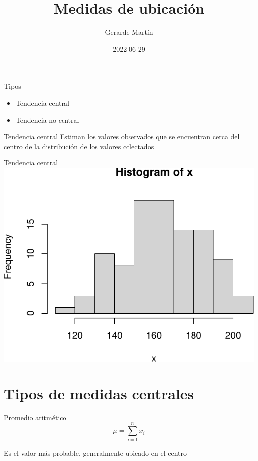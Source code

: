 \documentclass[
  11pt,
  ignorenonframetext,
]{beamer}
\title{Medidas de ubicación}
\author{Gerardo Martín}
\date{2022-06-29}
\begin{document}
\frame{\titlepage}

\begin{frame}{Tipos}
\protect\hypertarget{tipos}{}
\begin{itemize}
\item
  Tendencia central
\item
  Tendencia no central
\end{itemize}
\end{frame}

\begin{frame}{Tendencia central}
\protect\hypertarget{tendencia-central}{}
Estiman los valores observados que se encuentran cerca del centro de la
distribución de los valores colectados
\end{frame}

\begin{frame}{Tendencia central}
\protect\hypertarget{tendencia-central-1}{}
\includegraphics{Medidas-ubicacion_files/figure-beamer/unnamed-chunk-1-1.pdf}
\end{frame}

\hypertarget{tipos-de-medidas-centrales}{%
\section{Tipos de medidas centrales}\label{tipos-de-medidas-centrales}}

\begin{frame}{Promedio aritmético}
\protect\hypertarget{promedio-aritmuxe9tico}{}
\[ \mu = \sum_{i = 1}^{n} x_i\]

Es el valor más probable, generalmente ubicado en el centro
\end{frame}
\end{document}
